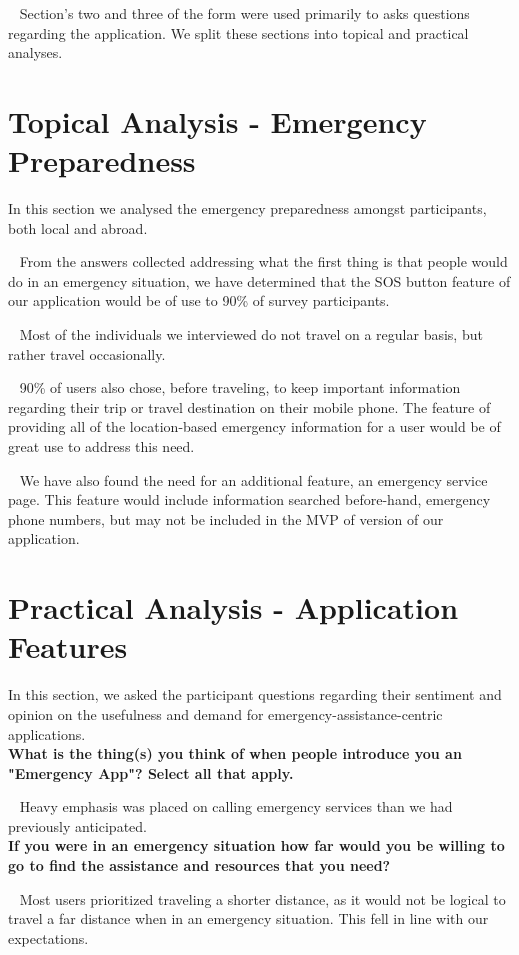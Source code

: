 \documentclass{scrreprt}
\begin{document}
\par ~ Section's two and three of the form were used primarily to asks questions regarding the application. We split these sections into topical and practical analyses.

\section{Topical Analysis - Emergency Preparedness}
In this section we analysed the emergency preparedness amongst participants, both local and abroad.

\par ~ From the answers collected addressing what the first thing is that people would do in an emergency situation, we have determined that the SOS button feature of our application would be of use to 90\% of survey participants.

\par ~ Most of the individuals we interviewed do not travel on a regular basis, but rather travel occasionally. 

\par ~ 90\% of users also chose, before traveling, to keep important information regarding their trip or travel destination on their mobile phone. The feature of providing all of the location-based emergency information for a user would be of great use to address this need.

\par ~ We have also found the need for an additional feature, an emergency service page. This feature would include information searched before-hand, emergency phone numbers, but may not be included in the MVP of version of our application.

\section{Practical Analysis - Application Features}
In this section, we asked the participant questions regarding their sentiment and opinion on the usefulness and demand for emergency-assistance-centric applications. \\

\textbf{What is the thing(s) you think of when people introduce you an "Emergency App"? Select all that apply.} 
\par ~ Heavy emphasis was placed on calling emergency services than we had previously anticipated. \\

\textbf{If you were in an emergency situation how far would you be willing to go to find the assistance and resources that you need?} 
\par ~ Most users prioritized traveling a shorter distance, as it would not be logical to travel a far distance when in an emergency situation. This fell in line with our expectations. \\
\end{document}
